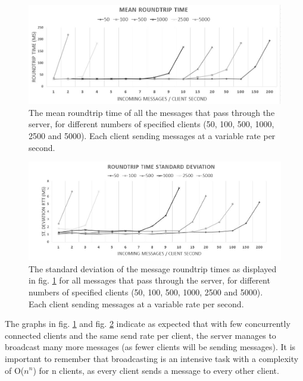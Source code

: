 \documentclass[bsc,frontabs,twoside,singlespacing,parskip,deptreport]{infthesis}     %
\begin{document}
\begin{figure}[H]
\centering
\includegraphics[scale=0.46]{images/test_SERVER_RTTmean.jpg}
\caption{The mean roundtrip time of all the messages that pass through the server, for different numbers of specified clients (50, 100, 500, 1000, 2500 and 5000). Each client sending messages at a variable rate per second.}
\label{fig:broadcast_rtt_mean}
\end{figure}

\begin{figure}[H]
\centering
\includegraphics[scale=0.46]{images/test_SERVER_RTTstd.jpg}
\caption{The standard deviation of the message roundtrip times as displayed in fig. \ref{fig:broadcast_rtt_mean} for all messages that pass through the server, for different numbers of specified clients (50, 100, 500, 1000, 2500 and 5000). Each client sending messages at a variable rate per second.}
\label{fig:broadcast_rtt_std}
\end{figure}

The graphs in fig. \ref{fig:broadcast_rtt_mean} and fig. \ref{fig:broadcast_rtt_std} indicate as expected that with few concurrently connected clients and the same send rate per client, the server manages to broadcast many more messages (as fewer clients will be sending messages). It is important to remember that broadcasting is an intensive task with a complexity of O($n^{n}$) for n clients, as every client sends a message to every other client.
\end{document}

